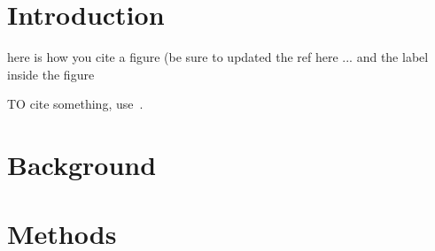 \documentclass[11pt]{article}
\begin{document}
\maketitle


\section{Introduction}
here is how you cite a figure (be sure to updated the ref here ... and the 
label inside the figure

TO cite something, use~\cite{fasy2014statistical}.


\section{Background}

\section{Methods}
\end{document}
